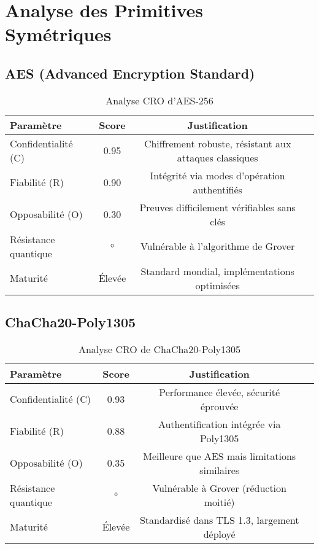 \section{Analyse des Primitives Symétriques}
\subsection{AES (Advanced Encryption Standard)}
\begin{table}[H]
\centering
\begin{tabular}{lccc}
\hline
\textbf{Paramètre} & \textbf{Score} & \textbf{Justification} \\
\hline
Confidentialité (C) & 0.95 & Chiffrement robuste, résistant aux attaques classiques \\
Fiabilité (R) & 0.90 & Intégrité via modes d'opération authentifiés \\
Opposabilité (O) & 0.30 & Preuves difficilement vérifiables sans clés \\
Résistance quantique & \(\circ\) & Vulnérable à l'algorithme de Grover \\
Maturité & Élevée & Standard mondial, implémentations optimisées \\
\hline
\end{tabular}
\caption{Analyse CRO d'AES-256}
\end{table}

\subsection{ChaCha20-Poly1305}
\begin{table}[H]
\centering
\begin{tabular}{lccc}
\hline
\textbf{Paramètre} & \textbf{Score} & \textbf{Justification} \\
\hline
Confidentialité (C) & 0.93 & Performance élevée, sécurité éprouvée \\
Fiabilité (R) & 0.88 & Authentification intégrée via Poly1305 \\
Opposabilité (O) & 0.35 & Meilleure que AES mais limitations similaires \\
Résistance quantique & \(\circ\) & Vulnérable à Grover (réduction moitié) \\
Maturité & Élevée & Standardisé dans TLS 1.3, largement déployé \\
\hline
\end{tabular}
\caption{Analyse CRO de ChaCha20-Poly1305}
\end{table}

